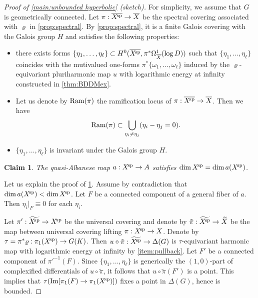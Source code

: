 \documentclass[english]{amsproc}
\theoremstyle{plain}
\newtheorem{claim}[thm]{Claim}
\theoremstyle{definition}
\theoremstyle{remark}
\theoremstyle{plain}
\numberwithin{equation}{thm} %
\newcommand{\xsp}{X^{\! \rm sp}}
\begin{document}
	\begin{proof}[Proof of \cref{main:unbounded hyperbolic} (sketch)]
		For simplicity, we assume that $G$ is geometrically connected. 	Let $\pi:\overline{\xsp}\to \overline{X}$ be the spectral covering  associated with $\varrho$ in \cref{prop:spectral}. By \cref{prop:spectral}, it is a finite Galois covering with the Galois group $H$ and satisfies the following properties:
		\begin{itemize}
			\item there exists forms $\{\eta_1,\ldots,\eta_\ell\}\subset H^0(\overline{\xsp},\pi^*\Omega_{\overline{X}}^1(\log D))$ such that $\{\eta_1,\ldots,\eta_\ell\}$ coincides with the mutivalued one-forms $\pi^*\{\omega_1,\ldots,\omega_\ell\}$ induced by the $\varrho$-equivariant pluriharmonic map $u$ with logarithmic energy at infinity constructed in \cref{thm:BDDMex}.
			\item 
			Let us denote by ${\rm Ram}(\pi)$  the ramification locus of $\pi:\overline{\xsp}\to \overline{X}$. Then we have
			\begin{align}\label{eq:ramification}
				{\rm Ram}(\pi)\subset \bigcup_{\eta_i\neq\eta_j}(\eta_i-\eta_j=0).
			\end{align} 
			\item  
			$\{\eta_1,\ldots,\eta_\ell\}$ is invariant under the Galois group $H$. 
		\end{itemize}
		\begin{claim}\label{claim:generically}
			The quasi-Albanese map $a:\xsp\to A$  satisfies $\dim \xsp=\dim a(\xsp)$.
		\end{claim} 
		Let us explain the proof of \cref{claim:generically}. Assume by contradiction that $\dim a(\xsp)<\dim \xsp$. Let $F$ be a connected component of a general fiber of $a$.  Then $\eta_i|_{F}\equiv 0$ for each $\eta_i$.  
		
		Let $\pi':\widetilde{\xsp}\to \xsp$ be the universal covering   and denote by $\tilde{\pi}:\widetilde{\xsp}\to \widetilde{X}$ be the map between universal covering lifting $\pi:\xsp\to X$.  Denote by $\tau=\pi^*\varrho: \pi_1(\xsp)\to G(K)$.  Then $u\circ\tilde{\pi}:\widetilde{\xsp}\to \Delta(G)$ is  $\tau$-equivariant harmonic map with logarithmic energy at infinity by \cref{item:pullback}. Let $F'$ be a connected component of $\pi'^{-1}(F)$.   Since 	$\{\eta_1,\ldots,\eta_\ell\}$  is generically the $(1,0)$-part of complexified differentials of $u\circ \tilde{\pi}$, it follows that $u\circ\tilde{\pi}(F')$ is a point. This implies that $\tau({\rm Im}[\pi_1(F)\to \pi_1(\xsp)])$ fixes a point in $\Delta(G)$, hence is bounded. 
		

\end{proof}
\end{document}
